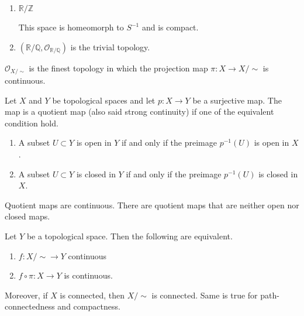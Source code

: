 \begin{exmbox}
    \begin{example}
        \begin{enumerate}
            \item \(\mathbb{R} / \mathbb{Z}\)

            This space is homeomorph to \(S^{-1}\) and is compact.
            \item \((\mathbb{R} / \mathbb{Q}, \mathcal{O}_{\mathbb{R} / \mathbb{Q}})\) is the trivial topology.
        \end{enumerate}
    \end{example}
\end{exmbox}

\begin{thmbox}
    \begin{proposition}
        \(\mathcal{O}_{X / \sim}\) is the {\color{maththen}finest} {\color{mathobj}topology} in which the {\color{mathif}projection map} \(\pi: X \longrightarrow X / \sim\) is {\color{mathif}continuous}.
    \end{proposition}
\end{thmbox}
\begin{defbox}
    Let \(X\) and \(Y\) be topological spaces and let \(p: X \longrightarrow Y\) be a surjective map. The map is a quotient map (also said strong continuity) if one of the equivalent condition hold.
    \begin{enumerate}
        \item A subset \(U \subset Y\) is open in \(Y\) if and only if the preimage \(p^{-1}(U)\) is open in \(X\).
        \item A subset \(U \subset Y\) is closed in \(Y\) if and only if the preimage \(p^{-1}(U)\) is closed in \(X\).
    \end{enumerate}
\end{defbox}
\begin{rembox}
    \begin{remark}
        Quotient maps are continuous. There are quotient maps that are neither open nor closed maps.
    \end{remark}
\end{rembox}

\begin{thmbox}
    \begin{theorem}
        Let \(Y\) be a topological space. Then the following are equivalent.
        \begin{enumerate}
            \item \(f: X / \sim \longrightarrow Y\) continuous
            \item \(f \circ \pi : X \longrightarrow Y\) is continuous.
        \end{enumerate}

        Moreover, if \(X\) is connected, then \(X / \sim\) is connected. Same is true for path-connectedness and compactness.
    \end{theorem}
\end{thmbox}

